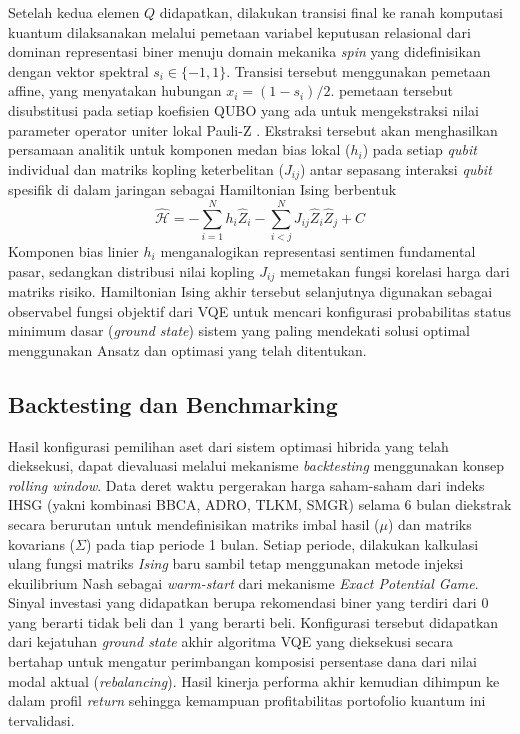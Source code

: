 Setelah kedua elemen $Q$ didapatkan, dilakukan transisi final ke ranah komputasi kuantum dilaksanakan melalui pemetaan variabel keputusan relasional dari dominan representasi biner menuju domain mekanika \textit{spin} yang didefinisikan dengan vektor spektral $s_i \in \{-1, 1\}$. Transisi tersebut menggunakan pemetaan affine, yang menyatakan hubungan $x_i = (1 - s_i)/2$. pemetaan tersebut disubstitusi pada setiap koefisien QUBO yang ada untuk mengekstraksi nilai parameter operator uniter lokal Pauli-Z \cite{nakahara_quantum_2008}. Ekstraksi tersebut akan menghasilkan persamaan analitik untuk komponen medan bias lokal ($h_i$) pada setiap \textit{qubit} individual dan matriks kopling keterbelitan ($J_{ij}$) antar sepasang interaksi \textit{qubit} spesifik di dalam jaringan sebagai Hamiltonian Ising berbentuk
\begin{equation}
\label{eq:ising}
\hat{\mathcal{H}} = - \sum_{i=1}^N h_i \hat{Z}_i - \sum_{i<j}^N J_{ij} \hat{Z}_i \hat{Z}_j + C
\end{equation}
Komponen bias linier $h_i$ menganalogikan representasi sentimen fundamental pasar, sedangkan distribusi nilai kopling $J_{ij}$ memetakan fungsi korelasi harga dari matriks risiko. Hamiltonian Ising akhir tersebut selanjutnya digunakan sebagai observabel fungsi objektif dari VQE untuk mencari konfigurasi probabilitas status minimum dasar (\textit{ground state}) sistem yang paling mendekati solusi optimal menggunakan Ansatz dan optimasi yang telah ditentukan.

\subsection{Backtesting dan Benchmarking}

Hasil konfigurasi pemilihan aset dari sistem optimasi hibrida yang telah dieksekusi, dapat dievaluasi melalui mekanisme \textit{backtesting} menggunakan konsep \textit{rolling window}. Data deret waktu pergerakan harga saham-saham dari indeks IHSG (yakni kombinasi BBCA, ADRO, TLKM, SMGR) selama 6 bulan diekstrak secara berurutan untuk mendefinisikan matriks imbal hasil ($\mu$) dan matriks kovarians ($\Sigma$) pada tiap periode 1 bulan. Setiap periode, dilakukan kalkulasi ulang fungsi matriks \textit{Ising} baru sambil tetap menggunakan metode injeksi ekuilibrium Nash sebagai \textit{warm-start} dari mekanisme \textit{Exact Potential Game}. Sinyal investasi yang didapatkan berupa rekomendasi biner yang terdiri dari 0 yang berarti tidak beli dan 1 yang berarti beli. Konfigurasi tersebut didapatkan dari kejatuhan \textit{ground state} akhir algoritma VQE yang dieksekusi secara bertahap untuk mengatur perimbangan komposisi persentase dana dari nilai modal aktual (\textit{rebalancing}). Hasil kinerja performa akhir kemudian dihimpun ke dalam profil \textit{return} sehingga kemampuan profitabilitas portofolio kuantum ini tervalidasi.

